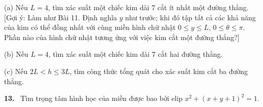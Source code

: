 \documentclass[12pt,a4paper]{article}
\newcommand{\bt}[1]{\par\smallskip\Needspace{5\baselineskip}\noindent\textbf{#1.}\ }
\begin{document}
(a) Nếu $L=4$, tìm xác suất một chiếc kim dài 7 cắt ít nhất một đường thẳng. [Gợi ý: Làm như Bài 11. Định nghĩa $y$ như trước; khi đó tập tất cả các khả năng của kim có thể đồng nhất với cùng miền hình chữ nhật $0\le y\le L$, $0\le\theta\le\pi$. Phần nào của hình chữ nhật tương ứng với việc kim cắt một đường thẳng?]

(b) Nếu $L=4$, tìm xác suất một chiếc kim dài 7 cắt hai đường thẳng.

(c) Nếu $2L<h\le3L$, tìm công thức tổng quát cho xác suất kim cắt ba đường thẳng.
\bt{13} Tìm trọng tâm hình học của miền được bao bởi elip $x^2+(x+y+1)^2=1$.
\end{document}

